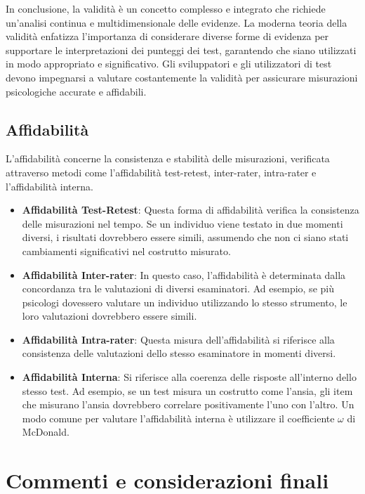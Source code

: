 \documentclass[
  letterpaper,
  krantz2]{{[}./krantz{]}}
\begin{document}
In conclusione, la validità è un concetto complesso e integrato che
richiede un'analisi continua e multidimensionale delle evidenze. La
moderna teoria della validità enfatizza l'importanza di considerare
diverse forme di evidenza per supportare le interpretazioni dei punteggi
dei test, garantendo che siano utilizzati in modo appropriato e
significativo. Gli sviluppatori e gli utilizzatori di test devono
impegnarsi a valutare costantemente la validità per assicurare
misurazioni psicologiche accurate e affidabili.

\subsection{Affidabilità}\label{affidabilituxe0}

L'affidabilità concerne la consistenza e stabilità delle misurazioni,
verificata attraverso metodi come l'affidabilità test-retest,
inter-rater, intra-rater e l'affidabilità interna.

\begin{itemize}
\item
  \textbf{Affidabilità Test-Retest}: Questa forma di affidabilità
  verifica la consistenza delle misurazioni nel tempo. Se un individuo
  viene testato in due momenti diversi, i risultati dovrebbero essere
  simili, assumendo che non ci siano stati cambiamenti significativi nel
  costrutto misurato.
\item
  \textbf{Affidabilità Inter-rater}: In questo caso, l'affidabilità è
  determinata dalla concordanza tra le valutazioni di diversi
  esaminatori. Ad esempio, se più psicologi dovessero valutare un
  individuo utilizzando lo stesso strumento, le loro valutazioni
  dovrebbero essere simili.
\item
  \textbf{Affidabilità Intra-rater}: Questa misura dell'affidabilità si
  riferisce alla consistenza delle valutazioni dello stesso esaminatore
  in momenti diversi.
\item
  \textbf{Affidabilità Interna}: Si riferisce alla coerenza delle
  risposte all'interno dello stesso test. Ad esempio, se un test misura
  un costrutto come l'ansia, gli item che misurano l'ansia dovrebbero
  correlare positivamente l'uno con l'altro. Un modo comune per valutare
  l'affidabilità interna è utilizzare il coefficiente \(\omega\) di
  McDonald.
\end{itemize}

\section{Commenti e considerazioni
finali}\label{commenti-e-considerazioni-finali}
\end{document}

